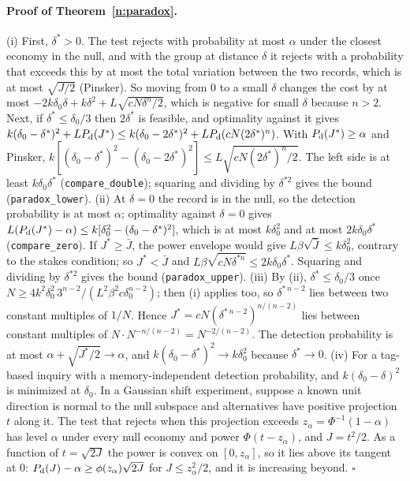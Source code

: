 \documentclass[12pt]{article}
\theoremstyle{definition}
\theoremstyle{remark}
\begin{document}
\paragraph{Proof of Theorem~\ref{n:paradox}.} (i) First, $\delta^*>0$. The test rejects with probability at most $\alpha$ under the closest economy in the null, and with the group at distance $\delta$ it rejects with a probability that exceeds this by at most the total variation between the two records, which is at most $\sqrt{J/2}$ (Pinsker). So moving from $0$ to a small $\delta$ changes the cost by at most $-2k\delta_0\delta+k\delta^2+L\sqrt{cN\delta^n/2}$, which is negative for small $\delta$ because $n>2$. Next, if $\delta^*\le\delta_0/3$ then $2\delta^*$ is feasible, and optimality against it gives $k(\delta_0-\delta^*)^2+LP_{\rm d}(J^*)\le k(\delta_0-2\delta^*)^2+LP_{\rm d}(cN(2\delta^*)^n)$. With $P_{\rm d}(J^*)\ge\alpha$ and Pinsker, $k[(\delta_0-\delta^*)^2-(\delta_0-2\delta^*)^2]\le L\sqrt{cN(2\delta^*)^n/2}$. The left side is at least $k\delta_0\delta^*$ (\nolinkurl{compare_double}); squaring and dividing by $\delta^{*2}$ gives the bound (\nolinkurl{paradox_lower}).
(ii) At $\delta=0$ the record is in the null, so the detection probability is at most $\alpha$; optimality against $\delta=0$ gives $L(P_{\rm d}(J^*)-\alpha)\le k[\delta_0^2-(\delta_0-\delta^*)^2]$, which is at most $k\delta_0^2$ and at most $2k\delta_0\delta^*$ (\nolinkurl{compare_zero}). If $J^*\ge\bar J$, the power envelope would give $L\beta\sqrt{\bar J}\le k\delta_0^2$, contrary to the stakes condition; so $J^*<\bar J$ and $L\beta\sqrt{cN\delta^{*n}}\le2k\delta_0\delta^*$. Squaring and dividing by $\delta^{*2}$ gives the bound (\nolinkurl{paradox_upper}).
(iii) By (ii), $\delta^*\le\delta_0/3$ once $N\ge4k^2\delta_0^2\,3^{n-2}/(L^2\beta^2c\delta_0^{n-2})$; then (i) applies too, so $\delta^{*\,n-2}$ lies between two constant multiples of $1/N$. Hence $J^*=cN(\delta^{*\,n-2})^{n/(n-2)}$ lies between constant multiples of $N\cdot N^{-n/(n-2)}=N^{-2/(n-2)}$. The detection probability is at most $\alpha+\sqrt{J^*/2}\to\alpha$, and $k(\delta_0-\delta^*)^2\to k\delta_0^2$ because $\delta^*\to0$.
(iv) For a tag-based inquiry with a memory-independent detection probability, and $k(\delta_0-\delta)^2$ is minimized at $\delta_0$.
In a Gaussian shift experiment, suppose a known unit direction is normal to the null subspace and alternatives have positive projection $t$ along it. The test that rejects when this projection exceeds $z_\alpha=\Phi^{-1}(1-\alpha)$ has level $\alpha$ under every null economy and power $\Phi(t-z_\alpha)$, and $J=t^2/2$. As a function of $t=\sqrt{2J}$ the power is convex on $[0,z_\alpha]$, so it lies above its tangent at $0$: $P_{\rm d}(J)-\alpha\ge\phi(z_\alpha)\sqrt{2J}$ for $J\le z_\alpha^2/2$, and it is increasing beyond. $\square$
\end{document}
